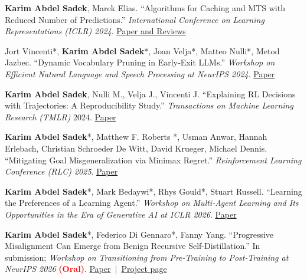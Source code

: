 \vspace{-0.2cm}
\begin{enumerate}[%
    label={[\arabic*]},        %
    labelwidth=1em,          %
    labelsep=0.5em,            %
    leftmargin=!,              %
    align=right,               %
    itemsep=6pt,               %
    parsep=0pt,                %
    listparindent=0pt          %
]
  \item \textbf{Karim Abdel Sadek}, Marek Elias. “Algorithms for Caching and MTS with Reduced Number of Predictions.” \textit{International Conference on Learning Representations (ICLR) 2024}. \href{https://openreview.net/forum?id=QuIiLSktO4}{Paper and Reviews}


  \item Jort Vincenti*, \textbf{Karim Abdel Sadek}*, Joan Velja*, Matteo Nulli*, Metod Jazbec. “Dynamic Vocabulary Pruning in Early‑Exit LLMs.” \textit{Workshop on Efficient Natural Language and Speech Processing at NeurIPS 2024}. \href{https://arxiv.org/abs/2410.18952}{Paper}

  \item \textbf{Karim Abdel Sadek}, Nulli M., Velja J., Vincenti J. “Explaining RL Decisions with Trajectories: A Reproducibility Study.” \textit{Transactions on Machine Learning Research (TMLR)} 2024. \href{https://openreview.net/pdf?id=QdeBbK5CSh}{Paper}

   \item \textbf{Karim Abdel Sadek}*, Matthew F. Roberts *, Usman Anwar, Hannah Erlebach, Christian Schroeder De Witt, David Krueger, Michael Dennis. “Mitigating Goal Misgeneralization via Minimax Regret.” \textit{Reinforcement Learning Conference (RLC) 2025}. \href{https://openreview.net/forum?id=okCqx1RdIw#discussion}{Paper}

  \item \textbf{Karim Abdel Sadek}*, Mark Bedaywi*, Rhys Gould*, Stuart Russell. “Learning the Preferences of a Learning Agent.” \textit{Workshop on Multi-Agent Learning and Its Opportunities in the Era of Generative AI at ICLR 2026}. \href{https://arxiv.org/abs/2605.09217}{Paper}

  \item \textbf{Karim Abdel Sadek}*, Federico Di Gennaro*, Fanny Yang. “Progressive Misalignment Can Emerge from Benign Recursive Self-Distillation.” In submission; \textit{Workshop on Transitioning from Pre-Training to Post-Training at NeurIPS 2026} \textcolor{red}{\textbf{(Oral)}}. \href{https://arxiv.org/abs/2610.22467}{Paper} \,|\, \href{https://progressive-misalignment.github.io/}{Project page}
\end{enumerate}